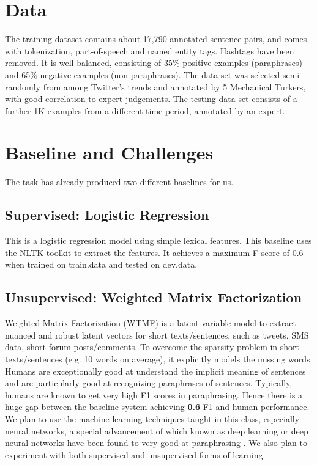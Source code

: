 \documentclass[10pt]{article}
\begin{document}
\section{Data}
\vspace{-0.1in}
The training dataset contains about 17,790 annotated sentence pairs, and comes with tokenization, part-of-speech and named entity tags.  Hashtags have been removed.  It is well balanced, consisting of 35\% positive examples (paraphrases) and 65\% negative examples (non-paraphrases).  The data set was selected semi-randomly from among Twitter's trends and annotated by 5 Mechanical Turkers, with good correlation to expert judgements.  The testing data set consists of a further 1K examples from a different time period, annotated by an expert.

\section{Baseline and Challenges}
\vspace{-0.1in}
The task has already produced two different baselines for us.
\subsection{Supervised: Logistic Regression}
This is a logistic regression model using simple lexical features. This baseline uses the NLTK toolkit to extract the features.
It achieves a maximum F-score of 0.6 when trained on train.data and tested on dev.data.
\subsection{Unsupervised: Weighted Matrix Factorization}
Weighted Matrix Factorization (WTMF) is a latent variable model to extract nuanced and robust latent vectors for short texts/sentences, such as tweets, SMS data, short forum posts/comments. To overcome the sparsity problem in short texts/sentences (e.g. 10 words on average), it explicitly models the missing words.\\

Humans are exceptionally good at understand the implicit meaning of sentences and are particularly good at recognizing paraphrases of sentences. Typically, humans are known to get very high F1 scores in paraphrasing. Hence there is a huge gap between the baseline system achieving \textbf{0.6} F1 and human performance.\\

We plan to use the machine learning techniques taught in this class, especially neural networks, a special advancement of which known as deep learning or deep neural networks have been found to very good at paraphrasing \cite{richard}. We also plan to experiment with both supervised and unsupervised forms of learning.
\end{document}
